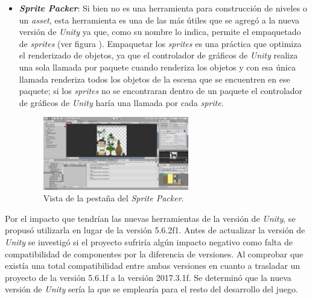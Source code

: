 \begin{itemize}
		\item \textbf{\textit{Sprite Packer}}: Si bien no es una herramienta para 
		construcción de niveles o un \textit{asset}, esta herramienta es una de las 
		más útiles que se agregó a la nueva versión de \textit{Unity} ya que, como 
		su nombre lo indica, permite el empaquetado de \textit{sprites} (ver figura ). 
		Empaquetar 
		los \textit{sprites} es una práctica que optimiza el renderizado de objetos, 
		ya que el controlador de gráficos de \textit{Unity} realiza una sola llamada 
		por paquete cuando renderiza los objetos y con esa única llamada renderiza todos 
		los objetos de la escena que se encuentren en ese paquete; si los 
		\textit{sprites} no se encontraran dentro de un paquete el controlador de 
		gráficos de \textit{Unity} haría una llamada por cada \textit{sprite}.  
			\begin{figure}[h]
    			\centering
    			\includegraphics[width=0.6\textwidth]{02Antecedentes/Imagenes/01.png}
    			\caption{Vista de la pestaña del \textit{Sprite Packer}.}
    			\label{fig:CinemaPantalla}
			\end{figure}
	\end{itemize}
	Por el impacto que tendrían las nuevas herramientas de la versión de 
	\textit{Unity}, se propusó utilizarla en lugar de la versión 5.6.2f1. Antes 
	de actualizar la versión de \textit{Unity} se investigó si el proyecto sufriría 
	algún impacto negativo como falta de compatibilidad de componentes por la 
	diferencia de versiones. Al comprobar que existía una total compatibilidad 
	entre ambas versiones en cuanto a trasladar un proyecto de la versión 5.6.1f 
	a la versión 2017.3.1f. Se determinó que la nueva versión de \textit{Unity} 
	sería la que se emplearía para el resto del desarrollo del juego.
	

